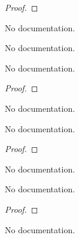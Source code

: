 \begin{proof}
    \leanok
\end{proof}

\begin{definition}\label{HK}
        \leanok
                No documentation.
    \end{definition}

\begin{definition}\label{subgroupHK}
        \leanok
                No documentation.
    \end{definition}

\begin{theorem}\label{Ex5}
        \leanok
                No documentation.
    \end{theorem}

\begin{proof}
    \leanok
\end{proof}

\begin{definition}\label{S}
        \leanok
                No documentation.
    \end{definition}

\begin{theorem}\label{Ex6
--}
        \leanok
                No documentation.
    \end{theorem}

\begin{proof}
    \leanok
\end{proof}

\begin{definition}\label{f}
        \leanok
                No documentation.
    \end{definition}

\begin{theorem}\label{Ex13}
        \leanok
                No documentation.
    \end{theorem}

\begin{proof}
    \leanok
\end{proof}

\begin{definition}\label{Nat'}
        \leanok
                No documentation.
    \end{definition}

